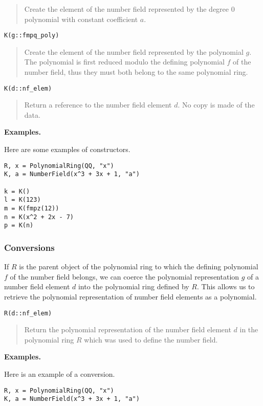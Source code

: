 \documentclass[a4paper,10pt]{article}
\newcommand{\desc}[1]{\vspace{-3mm}\begin{quote}#1\end{quote}}
\begin{document}
{{\desc{Create the element of the number field represented by the degree $0$
polynomial with constant coefficient $a$.}

\begin{lstlisting}
K(g::fmpq_poly)
\end{lstlisting}

\desc{Create the element of the number field represented by the polynomial
$g$. The polynomial is first reduced modulo the defining polynomial $f$ of
the number field, thus they must both belong to the same polynomial ring.}

\begin{lstlisting}
K(d::nf_elem)
\end{lstlisting}

\desc{Return a reference to the number field element $d$. No copy is made
of the data.}

\textbf{Examples.}

Here are some examples of constructors.

\begin{lstlisting}
R, x = PolynomialRing(QQ, "x")
K, a = NumberField(x^3 + 3x + 1, "a")

k = K()
l = K(123)
m = K(fmpz(12))
n = K(x^2 + 2x - 7)
p = K(n)
\end{lstlisting}

\subsubsection{Conversions}

If $R$ is the parent object of the polynomial ring to which the defining
polynomial $f$ of the number field belongs, we can coerce the polynomial
representation $g$ of a number field element $d$ into the polynomial ring
defined by $R$. This allows us to retrieve the polynomial representation
of number field elements as a polynomial.

\begin{lstlisting}
R(d::nf_elem)
\end{lstlisting}

\desc{Return the polynomial representation of the number field element $d$
in the polynomial ring $R$ which was used to define the number field.}

\textbf{Examples.}

Here is an example of a conversion.

\begin{lstlisting}
R, x = PolynomialRing(QQ, "x")
K, a = NumberField(x^3 + 3x + 1, "a")


\end{lstlisting}}}
\end{document}
